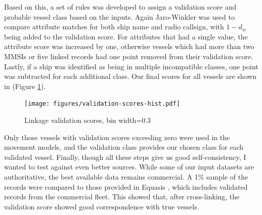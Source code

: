 Based on this, a set of rules was developed to assign a validation score and probable vessel class based on the inputs.  Again Jaro-Winkler was used to compare attribute matches for both ship name and radio callsign, with $1 - d_w$ being added to the validation score. For attributes that had a single value, the attribute score was increased by one, otherwise vessels which had more than two MMSIs or five linked records had one point removed from their validation score. Lastly, if a ship was identified as being in multiple incompatible classes, one point was subtracted for each additional class. Our final scores for all vessels are shown in (Figure \ref{fig:validation-score-hist}).

\begin{figure}[h!]
  \centering
    \texttt{[image: figures/validation-scores-hist.pdf]}
  \caption[Linkage validation scores]{Linkage validation scores, bin width=0.3}
  \label{fig:validation-score-hist}
\end{figure}

Only those vessels with validation scores exceeding zero were used in the movement models, and the validation class provides our chosen class for each validated vessel. Finally, though all these steps give us good self-consistency, I wanted to test against even better sources.  %
While some of our input datasets are authoritative, the best available data remains commercial. A 1\% sample of the records were compared to those provided in Equasis \citep{Equasis2011}, which includes validated records from the commercial fleet. This showed that, after cross-linking, the validation score showed good correspondence with true vessels.
